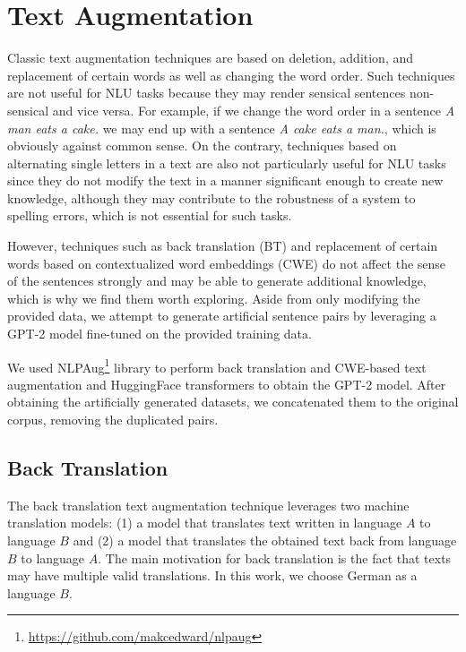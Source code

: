 \documentclass[10pt, a4paper]{article}
\begin{document}
\section{Text Augmentation}
\label{aug}
Classic text augmentation techniques are based on deletion, addition, and replacement of certain words as well as changing the word order. Such techniques are not useful for NLU tasks because they may render sensical sentences non-sensical and vice versa. For example, if we change the word order in a sentence \textit{A man eats a cake.} we may end up with a sentence \textit{A cake eats a man.}, which is obviously against common sense. On the contrary, techniques based on alternating single letters in a text are also not particularly useful for NLU tasks since they do not modify the text in a manner significant enough to create new knowledge, although they may contribute to the robustness of a system to spelling errors, which is not essential for such tasks.

However, techniques such as back translation (BT) and replacement of certain words based on contextualized word embeddings (CWE) do not affect the sense of the sentences strongly and may be able to generate additional knowledge, which is why we find them worth exploring. Aside from only modifying the provided data, we attempt to generate artificial sentence pairs by leveraging a GPT-2 model fine-tuned on the provided training data.

We used NLPAug\footnote{\href{https://github.com/makcedward/nlpaug}{https://github.com/makcedward/nlpaug}} library to perform back translation and CWE-based text augmentation and HuggingFace transformers to obtain the GPT-2 model. After obtaining the artificially generated datasets, we concatenated them to the original corpus, removing the duplicated pairs.


\subsection{Back Translation}
The back translation text augmentation technique leverages two machine translation models: (1) a model that translates text written in language $A$ to language $B$ and (2) a model that translates the obtained text back from language $B$ to language $A$. The main motivation for back translation is the fact that texts may have multiple valid translations. In this work, we choose German as a language $B$.
\end{document}
